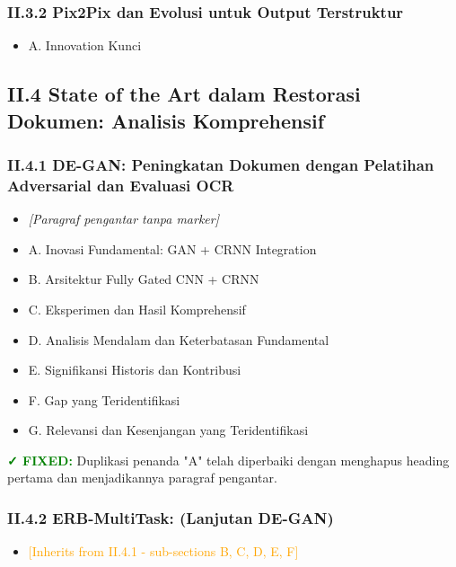 \documentclass[11pt,a4paper]{article}
\begin{document}
\subsubsection*{II.3.2 Pix2Pix dan Evolusi untuk Output Terstruktur}
\begin{itemize}[label={}, leftmargin=2em]
    \item A. Innovation Kunci
\end{itemize}

\vspace{0.5em}

\subsection*{II.4 State of the Art dalam Restorasi Dokumen: Analisis Komprehensif}

\subsubsection*{II.4.1 DE-GAN: Peningkatan Dokumen dengan Pelatihan Adversarial dan Evaluasi OCR}
\begin{itemize}[label={}, leftmargin=2em]
    \item \textit{[Paragraf pengantar tanpa marker]}
    \item A. Inovasi Fundamental: GAN + CRNN Integration
    \item B. Arsitektur Fully Gated CNN + CRNN
    \item C. Eksperimen dan Hasil Komprehensif
    \item D. Analisis Mendalam dan Keterbatasan Fundamental
    \item E. Signifikansi Historis dan Kontribusi
    \item F. Gap yang Teridentifikasi
    \item G. Relevansi dan Kesenjangan yang Teridentifikasi
\end{itemize}

\textcolor{green}{\textbf{✓ FIXED:}} Duplikasi penanda "A" telah diperbaiki dengan menghapus heading pertama dan menjadikannya paragraf pengantar.

\subsubsection*{II.4.2 ERB-MultiTask: (Lanjutan DE-GAN)}
\begin{itemize}[label={}, leftmargin=2em]
    \item \textcolor{orange}{[Inherits from II.4.1 - sub-sections B, C, D, E, F]}
\end{itemize}
\end{document}

